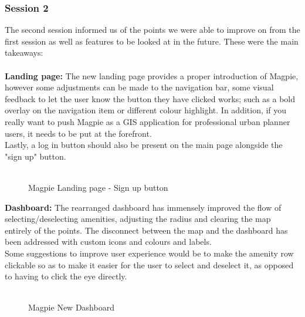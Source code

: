 \subsubsection{Session 2}
The second session informed us of the points we were able to improve on from the first session as well as features to be looked at in the future. These were the main takeaways:\\\\
\textbf{Landing page: }
The new landing page provides a proper introduction of Magpie, however some adjustments can be made to the navigation bar, some visual feedback to let the user know the button they have clicked works; such as a bold overlay on the navigation item or different colour highlight. In addition, if you really want to push Magpie as a GIS application for professional urban planner users, it needs to be put at the forefront.\\
Lastly, a log in button should also be present on the main page alongside the "sign up" button.\\\\
\begin{figure}
    \centering
    \caption{Magpie Landing page - Sign up button}
\end{figure}
\newpage
\textbf{Dashboard: }
The rearranged dashboard has immensely improved the flow of selecting/deselecting amenities, adjusting the radius and clearing the map entirely of the points. The disconnect between the map and the dashboard has been addressed with custom icons and colours and labels.\\
Some suggestions to improve user experience would be to make the amenity row clickable so as to make it easier for the user to select and deselect it, as opposed to having to click the eye directly.\\\\
\begin{figure}
    \centering
    \caption{Magpie New Dashboard}
\end{figure}
